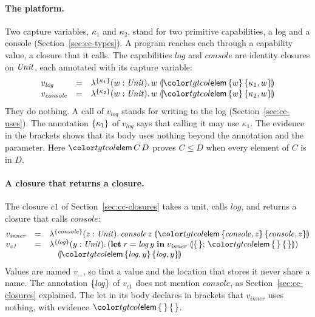 \paragraph{The platform.}
Two capture variables, $\kappa_1$ and $\kappa_2$, stand for two primitive capabilities, a log and a console (Section~\ref{sec:cc-types}). A program reaches each through a capability value, a closure that it calls. The capabilities $\mathit{log}$ and $\mathit{console}$ are identity closures on $\mathit{Unit}$, each annotated with its capture variable:
\[
\begin{array}{@{}lcl@{}}
v_{\mathit{log}} & = & \lamc{\cset{\kappa_1}}{w}{\Unit}{w}{\ev{elem}\,\cset{w}\,\cset{\kappa_1, w}} \\
v_{\mathit{console}} & = & \lamc{\cset{\kappa_2}}{w}{\Unit}{w}{\ev{elem}\,\cset{w}\,\cset{\kappa_2, w}}
\end{array}
\]
They do nothing. A call of $v_{\mathit{log}}$ stands for writing to the log (Section~\ref{sec:cc-uses}). The annotation $\{\kappa_1\}$ of $v_{\mathit{log}}$ says that calling it may use $\kappa_1$. The evidence in the brackets shows that its body uses nothing beyond the annotation and the parameter. Here $\ev{elem}\,C\,D$ proves $C \le D$ when every element of $C$ is in $D$.

\paragraph{A closure that returns a closure.}
The closure $\mathit{c1}$ of Section~\ref{sec:cc-closures} takes a unit, calls $\mathit{log}$, and returns a closure that calls $\mathit{console}$:
\[
\begin{array}{@{}lcl@{}}
v_{\mathit{inner}} & = & \lamc{\cset{\mathit{console}}}{z}{\Unit}{\mathit{console}\,z}{\ev{elem}\,\cset{\mathit{console}, z}\,\cset{\mathit{console}, z}} \\
v_{\mathit{c1}} & = & \lambda^{\cset{\mathit{log}}}(y : \Unit).\,(\letc{r}{\mathit{log}\,y}{v_{\mathit{inner}}}{\cempty}{\ev{elem}\,\cempty\,\cempty}) \\
& & \quad \ann{\ev{elem}\,\cset{\mathit{log}, y}\,\cset{\mathit{log}, y}}
\end{array}
\]
Values are named $v_{\ldots}$, so that a value and the location that stores it never share a name. The annotation $\{\mathit{log}\}$ of $v_{\mathit{c1}}$ does not mention $\mathit{console}$, as Section~\ref{sec:cc-closures} explained. The let in its body declares in brackets that $v_{\mathit{inner}}$ uses nothing, with evidence $\ev{elem}\,\cempty\,\cempty$.

